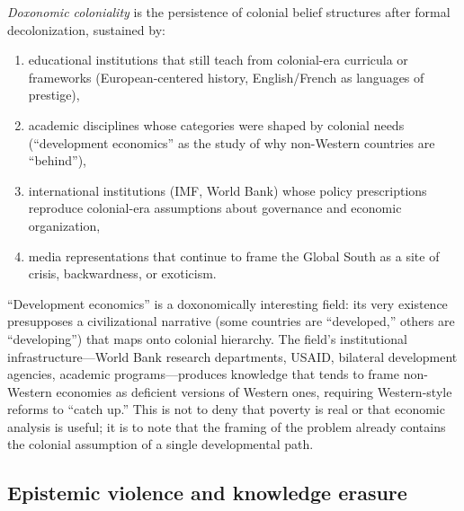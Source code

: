 \begin{definition}
\label{def:coloniality}
\emph{Doxonomic coloniality} is the persistence of colonial belief structures after formal decolonization, sustained by:
\begin{enumerate}[nosep]
  \item educational institutions that still teach from colonial-era curricula or frameworks (European-centered history, English/French as languages of prestige),
  \item academic disciplines whose categories were shaped by colonial needs (``development economics'' as the study of why non-Western countries are ``behind''),
  \item international institutions (IMF, World Bank) whose policy prescriptions reproduce colonial-era assumptions about governance and economic organization,
  \item media representations that continue to frame the Global South as a site of crisis, backwardness, or exoticism.
\end{enumerate}
\end{definition}

\begin{example}
\label{ex:development-economics}
``Development economics'' is a doxonomically interesting field: its very existence presupposes a civilizational narrative (some countries are ``developed,'' others are ``developing'') that maps onto colonial hierarchy.
The field's institutional infrastructure---World Bank research departments, USAID, bilateral development agencies, academic programs---produces knowledge that tends to frame non-Western economies as deficient versions of Western ones, requiring Western-style reforms to ``catch up.''
This is not to deny that poverty is real or that economic analysis is useful; it is to note that the framing of the problem already contains the colonial assumption of a single developmental path.
\end{example}

\subsection{Epistemic violence and knowledge erasure}

